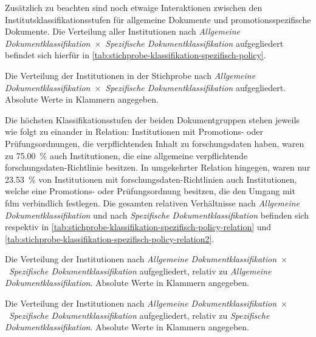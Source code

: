 Zusätzlich zu beachten sind noch etwaige Interaktionen zwischen den Institutsklassifikationsstufen für allgemeine Dokumente und promotionsspezifische Dokumente.
Die Verteilung aller Institutionen nach \textit{Allgemeine Dokumentklassifikation}~$\times$~\textit{Spezifische Dokumentklassifikation} aufgegliedert befindet sich hierfür in \cref{tab:stichprobe-klassifikation-spezifisch-policy}.
\begin{table}[!htbp]
	\caption{Die Verteilung der Institutionen in der Stichprobe nach \textit{Allgemeine Dokumentklassifikation}~$\times$~\textit{Spezifische Dokumentklassifikation} aufgegliedert. Absolute Werte in Klammern angegeben.}
    
	\label{tab:stichprobe-klassifikation-spezifisch-policy}
\end{table}
Die höchsten Klassifikationsstufen der beiden Dokumentgruppen stehen jeweils wie folgt zu einander in Relation:
Institutionen mit Promotions- oder Prüfungsordnungen, die verpflichtenden Inhalt zu \gls{forschungsdaten} haben, waren zu \SI{75,00}{\percent} auch Institutionen, die eine allgemeine verpflichtende \gls{forschungsdaten}-Richtlinie besitzen.
In umgekehrter Relation hingegen, waren nur \SI{23,53}{\percent} von Institutionen mit \gls{forschungsdaten}-Richtlinien auch Institutionen, welche eine Promotions- oder Prüfungsordnung besitzen, die den Umgang mit \gls{fdm} verbindlich festlegen.
Die gesamten relativen Verhältnisse nach \textit{Allgemeine Dokumentklassifikation} und nach \textit{Spezifische Dokumentklassifikation} befinden sich respektiv in \cref{tab:stichprobe-klassifikation-spezifisch-policy-relation} und \cref{tab:stichprobe-klassifikation-spezifisch-policy-relation2}.
\begin{table}[!htbp]
	\caption{Die Verteilung der Institutionen nach \textit{Allgemeine Dokumentklassifikation}~$\times$~\textit{Spezifische Dokumentklassifikation} aufgegliedert, relativ zu \textit{Allgemeine Dokumentklassifikation}. Absolute Werte in Klammern angegeben.}
    
	\label{tab:stichprobe-klassifikation-spezifisch-policy-relation}
\end{table}
\begin{table}[!htbp]
	\caption{Die Verteilung der Institutionen nach \textit{Allgemeine Dokumentklassifikation}~$\times$~\textit{Spezifische Dokumentklassifikation} aufgegliedert, relativ zu \textit{Spezifische Dokumentklassifikation}. Absolute Werte in Klammern angegeben.}
    
	\label{tab:stichprobe-klassifikation-spezifisch-policy-relation2}
\end{table}

